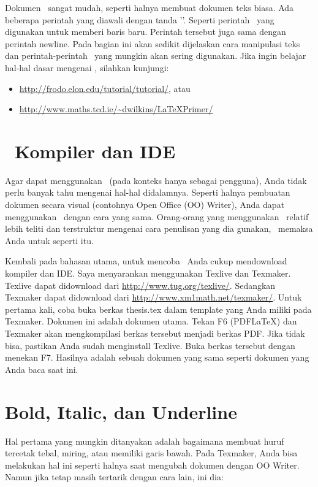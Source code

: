 Dokumen \latex~sangat mudah, seperti halnya membuat dokumen teks biasa. Ada 
beberapa perintah yang diawali dengan tanda '\bslash'. 
Seperti perintah \bslash\bslash~yang digunakan untuk memberi baris baru. 
Perintah tersebut juga sama dengan perintah \bslash newline. 
Pada bagian ini akan sedikit dijelaskan cara manipulasi teks dan 
perintah-perintah \latex~yang mungkin akan sering digunakan. 
Jika ingin belajar hal-hal dasar mengenai \latex, silahkan kunjungi: 

\begin{itemize}
	\item \url{http://frodo.elon.edu/tutorial/tutorial/}, atau
	\item \url{http://www.maths.tcd.ie/~dwilkins/LaTeXPrimer/}
\end{itemize}


\section{\latex~Kompiler dan IDE}
Agar dapat menggunakan \latex~(pada konteks hanya sebagai pengguna), Anda 
tidak perlu banyak tahu mengenai hal-hal didalamnya. 
Seperti halnya pembuatan dokumen secara visual (contohnya Open Office (OO) 
Writer), Anda dapat menggunakan \latex~dengan cara yang sama. 
Orang-orang yang menggunakan \latex~relatif lebih teliti dan terstruktur 
mengenai cara penulisan yang dia gunakan, \latex~memaksa Anda untuk seperti 
itu.  

Kembali pada bahasan utama, untuk mencoba \latex~Anda cukup mendownload 
kompiler dan IDE. Saya menyarankan menggunakan Texlive dan Texmaker. 
Texlive dapat didownload dari \url{http://www.tug.org/texlive/}. 
Sedangkan Texmaker dapat didownload dari 
\url{http://www.xm1math.net/texmaker/}. 
Untuk pertama kali, coba buka berkas thesis.tex dalam template yang Anda miliki 
pada Texmaker. 
Dokumen ini adalah dokumen utama. 
Tekan F6 (PDFLaTeX) dan Texmaker akan mengkompilasi berkas tersebut menjadi 
berkas PDF. 
Jika tidak bisa, pastikan Anda sudah menginstall Texlive. 
Buka berkas tersebut dengan menekan F7. 
Hasilnya adalah sebuah dokumen yang sama seperti dokumen yang Anda baca saat 
ini. 


\section{Bold, Italic, dan Underline}
Hal pertama yang mungkin ditanyakan adalah bagaimana membuat huruf tercetak 
tebal, miring, atau memiliki garis bawah. 
Pada Texmaker, Anda bisa melakukan hal ini seperti halnya saat mengubah dokumen 
dengan OO Writer. 
Namun jika tetap masih tertarik dengan cara lain, ini dia: 

